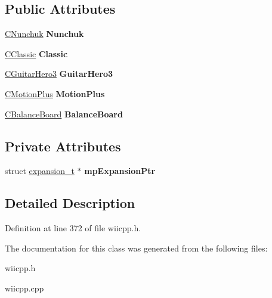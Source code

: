 \subsection*{Public Attributes}
\begin{DoxyCompactItemize}
\item 
\hypertarget{class_c_expansion_device_a9a30f45df41f2e0457fe3f57c0f0f53e}{\hyperlink{class_c_nunchuk}{C\-Nunchuk} {\bfseries Nunchuk}}\label{class_c_expansion_device_a9a30f45df41f2e0457fe3f57c0f0f53e}

\item 
\hypertarget{class_c_expansion_device_a2d84fd3250518acbcb28c733277a9931}{\hyperlink{class_c_classic}{C\-Classic} {\bfseries Classic}}\label{class_c_expansion_device_a2d84fd3250518acbcb28c733277a9931}

\item 
\hypertarget{class_c_expansion_device_a9ebd876c248d2b0242bf06181735a4e1}{\hyperlink{class_c_guitar_hero3}{C\-Guitar\-Hero3} {\bfseries Guitar\-Hero3}}\label{class_c_expansion_device_a9ebd876c248d2b0242bf06181735a4e1}

\item 
\hypertarget{class_c_expansion_device_a49310ff81cc6b9ac43839cb7f596cfa2}{\hyperlink{class_c_motion_plus}{C\-Motion\-Plus} {\bfseries Motion\-Plus}}\label{class_c_expansion_device_a49310ff81cc6b9ac43839cb7f596cfa2}

\item 
\hypertarget{class_c_expansion_device_aae5430823c39c8e8b836200b9b29ac42}{\hyperlink{class_c_balance_board}{C\-Balance\-Board} {\bfseries Balance\-Board}}\label{class_c_expansion_device_aae5430823c39c8e8b836200b9b29ac42}

\end{DoxyCompactItemize}
\subsection*{Private Attributes}
\begin{DoxyCompactItemize}
\item 
\hypertarget{class_c_expansion_device_a14884d7764e4c850f61c34f45ed2b97c}{struct \hyperlink{structexpansion__t}{expansion\-\_\-t} $\ast$ {\bfseries mp\-Expansion\-Ptr}}\label{class_c_expansion_device_a14884d7764e4c850f61c34f45ed2b97c}

\end{DoxyCompactItemize}


\subsection{Detailed Description}


Definition at line 372 of file wiicpp.\-h.



The documentation for this class was generated from the following files\-:\begin{DoxyCompactItemize}
\item 
wiicpp.\-h\item 
wiicpp.\-cpp\end{DoxyCompactItemize}

